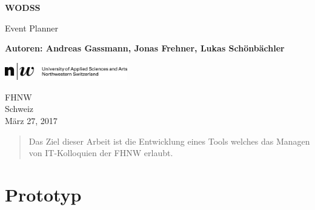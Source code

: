 \documentclass[11pt]{article} %
\begin{document}
\begin{titlepage}
    \begin{center}
        \vspace*{1cm}
        
        \Huge
        \textbf{WODSS}
        
        \vspace{0.5cm}
        \LARGE
        Event Planner
      
        \vspace{1.5cm}
        
        \textbf{Autoren: Andreas Gassmann, Jonas Frehner, Lukas Schönbächler}\\

		\vspace{1.5cm}        
                
        \vfill
        
       
        \vspace{0.8cm}
        
        \includegraphics[width=0.4\textwidth]{title/fhnw}
        
        \Large
        FHNW\\
        Schweiz\\
        März 27, 2017
        
    \end{center}
\end{titlepage}

\begin{abstract}
Das Ziel dieser Arbeit ist die Entwicklung eines Tools welches das Managen von IT-Kolloquien der FHNW erlaubt.
\end{abstract}

\newpage
\tableofcontents
\newpage

\section{Prototyp}
\end{document}
